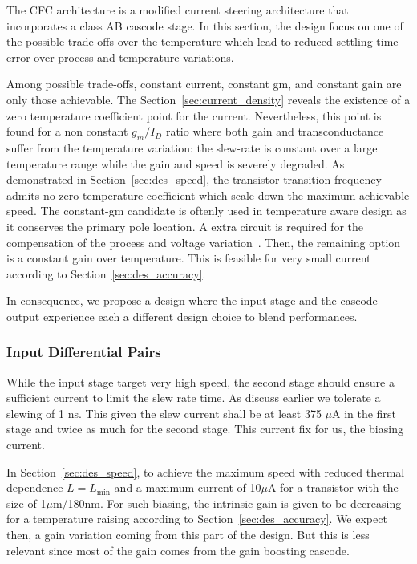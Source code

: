 The CFC architecture is a modified current steering architecture that incorporates a class AB cascode stage. In this section, the design focus on one of the possible trade-offs over the temperature which lead to reduced settling time error over process and temperature variations.

Among possible trade-offs, constant current, constant gm, and constant gain are only those achievable. The Section~\ref{sec:current_density} reveals the existence of a zero temperature coefficient point for the current. Nevertheless, this point is found for a non constant \(g_m/I_D \) ratio where both gain and transconductance suffer from the temperature variation: the slew-rate is constant over a large temperature range while the gain and speed is severely degraded. As demonstrated in Section~\ref{sec:des_speed}, the transistor transition frequency admits no zero temperature coefficient which scale down the maximum achievable speed. The constant-gm candidate is oftenly used in temperature aware design as it conserves the primary pole location. A extra circuit is required for the compensation of the process and voltage variation~\cite{Chu2014}. Then, the remaining option is a constant gain over temperature. This is feasible for very small current according to Section~\ref{sec:des_accuracy}.

In consequence, we propose a design where the input stage and the cascode output experience each a different design choice to blend performances.

\subsubsection{Input Differential Pairs}
While the input stage target very high speed, the second stage should ensure a sufficient current to limit the slew rate time. As discuss earlier we tolerate a slewing of 1 ns. This given the slew current shall be at least 375 \(\mu \)A in the first stage and twice as much for the second stage. This current fix for us, the biasing current.

In Section~\ref{sec:des_speed}, to achieve the maximum speed with reduced thermal dependence \(L=L_{\min} \) and a maximum current of 10\(\mu \)A for a transistor with the size of 1\(\mu \)m/180nm. For such biasing, the intrinsic gain is given to be decreasing for a temperature raising according to Section~\ref{sec:des_accuracy}. We expect then, a gain variation coming from this part of the design. But this is less relevant since most of the gain comes from the gain boosting cascode.

